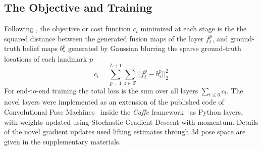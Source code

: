 \documentclass[10pt,twocolumn,letterpaper]{article}
\begin{document}
\subsection{The Objective and Training}
Following \cite{wei2016convolutional}, the objective or cost function $c_t$
minimized at each stage is the the squared distance between the generated fusion
maps of the layer $f^p_t$, and ground-truth belief maps $b_*^p$ generated by
Gaussian blurring the sparse ground-truth locations of each landmark $p$
\begin{equation}
c_t=\sum_{p=1}^{L+1}\sum_{z \in Z} ||f_t^p -b_*^p||_2^2
\end{equation}
For end-to-end training the total loss is the sum over all layers $\sum_{t\leq
  6} c_t$. The novel layers were implemented as an extension of the published
code of Convolutional Pose Machines~\cite{wei2016convolutional} inside the
\textit{Caffe} framework~\cite{jia2014caffe} as Python layers, with weights
updated using Stochastic Gradient Descent with momentum. Details of the novel
gradient updates used lifting estimates through 3d pose space are given in the
supplementary materials.
\end{document}
